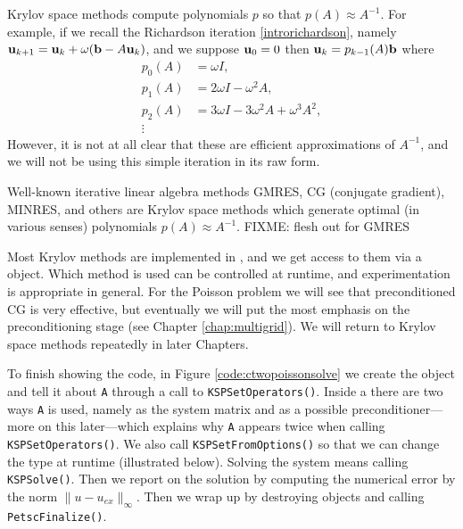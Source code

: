 
Krylov space methods compute polynomials $p$ so that $p(A) \approx A^{-1}$.  For example, if we recall the Richardson iteration \eqref{introrichardson}, namely $\mathbf{u}_{k+1} = \mathbf{u}_k + \omega (\mathbf{b} - A \mathbf{u}_k)$, and we suppose $\mathbf{u}_0=0$ then $\mathbf{u}_k = p_{k-1}(A) \mathbf{b}$ where
\begin{align*}
p_0(A) &= \omega I, \\
p_1(A) &= 2 \omega I - \omega^2 A, \\
p_2(A) &= 3 \omega I - 3 \omega^2 A + \omega^3 A^2, \\
\vdots
\end{align*}
However, it is not at all clear that these are efficient approximations of $A^{-1}$, and we will not be using this simple iteration in its raw form.


Well-known iterative linear algebra methods GMRES, CG (conjugate gradient), MINRES, and others \citep{Greenbaum1997,Saad2003} are Krylov space methods which generate optimal (in various senses) polynomials $p(A) \approx A^{-1}$. FIXME: flesh out for GMRES

Most Krylov methods are implemented in \PETSc, and we get access to them via a \pKSP object.  Which method is used can be controlled at runtime, and experimentation is appropriate in general.  For the Poisson problem we will see that preconditioned CG is very effective, but eventually we will put the most emphasis on the preconditioning stage (see Chapter \ref{chap:multigrid}).  We will return to Krylov space methods repeatedly in later Chapters.

To finish showing the code, in Figure \ref{code:ctwopoissonsolve} we create the \pKSP object and tell it about \texttt{A} through a call to \texttt{KSPSetOperators()}.  Inside a \pKSP there are two ways \texttt{A} is used, namely as the system matrix and as a possible preconditioner---more on this later---which explains why \texttt{A} appears twice when calling \texttt{KSPSetOperators()}.  We also call \texttt{KSPSetFromOptions()} so that we can change the \pKSP type at runtime (illustrated below).  Solving the system means calling \texttt{KSPSolve()}.  Then we report on the solution by computing the numerical error by the norm $\|u-u_{ex}\|_\infty$.  Then we wrap up by destroying objects and calling \texttt{PetscFinalize()}.


